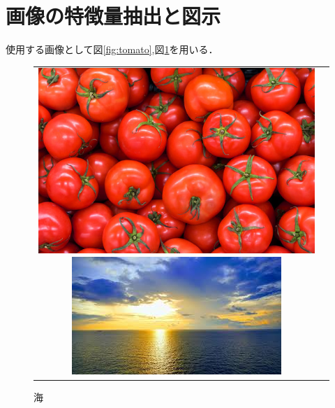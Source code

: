 \documentclass[color,subfigure,epsf,here,cite,otf,comment,nccmath,mediabb,fancyhdr,12pt]{ltjsarticle}
\begin{document}
    \section{画像の特徴量抽出と図示}
    使用する画像として図\ref{fig:tomato},図\ref{fig:sea}を用いる．
    \begin{figure}[H]
        \begin{tabular}{cc}
            \begin{minipage}{.5\textwidth}
                \centering
                \includegraphics[width=0.5\linewidth]{tomato.png}
                \caption{トマト}
                \label{fig:tomato}
            \end{minipage}
            \begin{minipage}{.5\textwidth}
                \centering
                \includegraphics[width=0.5\linewidth]{sea.png}
                \caption{海}
                \label{fig:sea}
            \end{minipage}
        \end{tabular}
    \end{figure}
    
	
\end{document}
